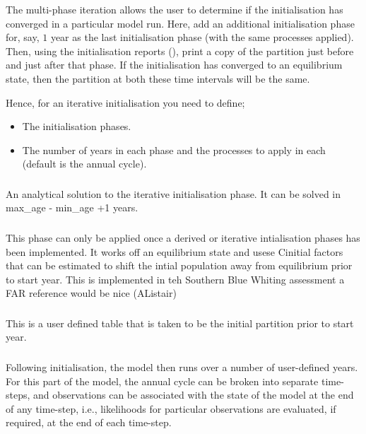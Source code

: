 The multi-phase iteration allows the user to determine if the initialisation has converged in a particular model run. Here, add an additional initialisation phase for, say, $1$ year as the last initialisation phase (with the same processes applied). Then, using the initialisation reports (), print a copy of the partition just before and just after that phase. If the initialisation has converged to an equilibrium state, then the partition at both these time intervals will be the same.

Hence, for an iterative initialisation you need to define;
\begin{itemize}
  \item The initialisation phases.
  \item The number of years in each phase and the processes to apply in each (default is the annual cycle).
\end{itemize}
\subsubsection*{}
An analytical solution to the iterative initialisation phase. It can be solved in max\_age - min\_age +1 years. 
\subsubsection*{}
This phase can only be applied once a derived or iterative intialisation phases has been implemented. It works off an equilibrium state and usese Cinitial factors that can be estimated to shift the intial population away from equilibrium prior to start year. This is implemented in teh Southern Blue Whiting assessment a FAR reference would be nice (AListair)
\subsubsection*{}
This is a user defined table that is taken to be the initial partition prior to start year.
\subsubsection*{}

Following initialisation, the model then runs over a number of user-defined years. For this part of the model, the annual cycle can be broken into separate time-steps, and observations can be associated with the state of the model at the end of any time-step, i.e., likelihoods for particular observations are evaluated, if required, at the end of each time-step. 

